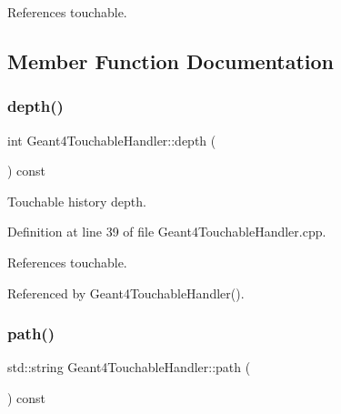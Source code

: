 References touchable.



\subsection{Member Function Documentation}
\hypertarget{class_d_d4hep_1_1_simulation_1_1_geant4_touchable_handler_ab56efe73054c432cdffdcdc911229062}{}\label{class_d_d4hep_1_1_simulation_1_1_geant4_touchable_handler_ab56efe73054c432cdffdcdc911229062} 
\subsubsection{\texorpdfstring{depth()}{depth()}}
{\footnotesize\ttfamily int Geant4\+Touchable\+Handler\+::depth (\begin{DoxyParamCaption}{ }\end{DoxyParamCaption}) const}



Touchable history depth. 



Definition at line 39 of file Geant4\+Touchable\+Handler.\+cpp.



References touchable.



Referenced by Geant4\+Touchable\+Handler().

\hypertarget{class_d_d4hep_1_1_simulation_1_1_geant4_touchable_handler_a7078dc9cd3315c3ad09436fee3e90311}{}\label{class_d_d4hep_1_1_simulation_1_1_geant4_touchable_handler_a7078dc9cd3315c3ad09436fee3e90311} 
\subsubsection{\texorpdfstring{path()}{path()}}
{\footnotesize\ttfamily std\+::string Geant4\+Touchable\+Handler\+::path (\begin{DoxyParamCaption}{ }\end{DoxyParamCaption}) const}



